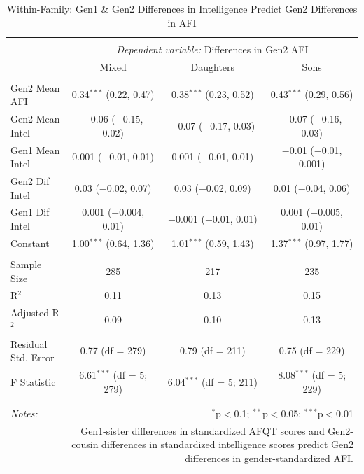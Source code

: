\documentclass[a4paper,man,apacite,natbib,12pt,longtable]{apa6}\usepackage[]{graphicx}\usepackage[]{color}
\begin{document}
\begin{landscape}
\begin{longtable}{@{\extracolsep{5pt}}lccc}
\caption{Within-Family: Gen1 \& Gen2 Differences in Intelligence Predict Gen2 Differences in AFI}\label{table_Dif_Joint_Intelligence_Dif_Child_AFI_9}
\\[-1.8ex]\hline 
\hline \\[-3.8ex] 
& \multicolumn{3}{c}{\textit{Dependent variable:} Differences in Gen2 AFI} \\ 
\cline{2-4}
 & Mixed & Daughters & Sons \\ 
\hline \\[-1.8ex] 
 Gen2 Mean AFI & 0.34$^{***}$ (0.22, 0.47) & 0.38$^{***}$ (0.23, 0.52) & 0.43$^{***}$ (0.29, 0.56) \\ 
  Gen2 Mean Intel & $-$0.06 ($-$0.15, 0.02) & $-$0.07 ($-$0.17, 0.03) & $-$0.07 ($-$0.16, 0.03) \\ 
  Gen1 Mean Intel & 0.001 ($-$0.01, 0.01) & 0.001 ($-$0.01, 0.01) & $-$0.01 ($-$0.01, 0.001) \\ 
  Gen2 Dif Intel & 0.03 ($-$0.02, 0.07) & 0.03 ($-$0.02, 0.09) & 0.01 ($-$0.04, 0.06) \\ 
  Gen1 Dif Intel & 0.001 ($-$0.004, 0.01) & $-$0.001 ($-$0.01, 0.01) & 0.001 ($-$0.005, 0.01) \\ 
  Constant & 1.00$^{***}$ (0.64, 1.36) & 1.01$^{***}$ (0.59, 1.43) & 1.37$^{***}$ (0.97, 1.77) \\ 
 \hline \\[-1.8ex] 
Sample Size & 285 & 217 & 235 \\ 
R$^{2}$ & 0.11 & 0.13 & 0.15 \\ 
Adjusted R$^{2}$ & 0.09 & 0.10 & 0.13 \\ 
Residual Std. Error & 0.77 (df = 279) & 0.79 (df = 211) & 0.75 (df = 229) \\ 
F Statistic & 6.61$^{***}$ (df = 5; 279) & 6.04$^{***}$ (df = 5; 211) & 8.08$^{***}$ (df = 5; 229) \\ 
\hline 
\hline \\[-1.8ex] \\[-8ex]
\textit{Notes:}  & \multicolumn{3}{r}{$^{*}$p$<$0.1; $^{**}$p$<$0.05; $^{***}$p$<$0.01} \\[2ex]
& \multicolumn{3}{r}{\parbox{.6\linewidth}{\footnotesize Gen1-sister differences in standardized AFQT scores and Gen2-cousin differences in standardized intelligence scores predict Gen2 differences in gender-standardized AFI.}} \\ 
\end{longtable}
\end{landscape}
\end{document}
